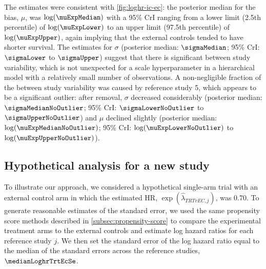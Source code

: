 \documentclass[11pt,final,fleqn]{article}\usepackage[]{graphicx}\usepackage[]{color}
\begin{document}
The estimates were consistent with  \autoref{fig:loghr-ic-ec}: the posterior median for the bias, $\mu$, was $\log(\muExpMedian)$ with a 95\% CrI ranging from a lower limit (2.5th percentile) of $\log(\muExpLower)$ to an upper limit (97.5th percentile) of  $\log(\muExpUpper)$, again implying that the external controls tended to have shorter survival. The estimates for $\sigma$ (posterior median: $\sigmaMedian$; 95\% CrI: $\sigmaLower$ to $\sigmaUpper$) suggest that there is significant between study variability, which is not unexpected for a scale hyperparameter in a hierarchical model with a relatively small number of observations. A non-negligible fraction of the between study variability was caused by reference study 5, which appears to be a significant outlier: after removal, $\sigma$ decreased considerably (posterior median: $\sigmaMedianNoOutlier$; 95\% CrI: $\sigmaLowerNoOutlier$ to $\sigmaUpperNoOutlier$) and $\mu$ declined slightly (posterior median: $\log(\muExpMedianNoOutlier)$; 95\% CrI: $\log(\muExpLowerNoOutlier)$ to $\log(\muExpUpperNoOutlier)$).


\subsection{Hypothetical analysis for a new study}
To illustrate our approach, we considered a hypothetical single-arm trial with an external control arm in which the estimated HR, $\exp(\hat{\lambda}_{\textit{TRT}vEC,j})$, was 0.70. To generate reasonable estimates of the standard error, we used the same propensity score methods described in \autoref{subsec:propensity-score} to compare the experimental treatment arms to the external controls and estimate log hazard ratios for each reference study $j$. We then set the standard error of the log hazard ratio equal to the median of the standard errors across the reference studies, $\medianLoghrTrtEcSe$.
\end{document}
